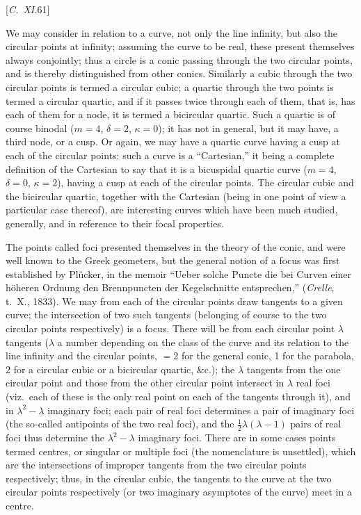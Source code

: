 \documentclass[12pt,a4paper,oneside]{book}
\newcommand{\paperref}[1]{\par\noindent\hfill[#1]\hfill\null\par}
\begin{document}
\paperref{\textit{C.~XI.}\hfill 61}
\newpage
We may consider in relation to a curve, not only the line infinity, but also the circular points at infinity; assuming the curve to be real, these present themselves always conjointly; thus a circle is a conic passing through the two circular points, and is thereby distinguished from other conics. Similarly a cubic through the two circular points is termed a circular cubic; a quartic through the two points is termed a circular quartic, and if it passes twice through each of them, that is, has each of them for a node, it is termed a bicircular quartic. Such a quartic is of course binodal ($m=4$, $\delta=2$, $\kappa=0$); it has not in general, but it may have, a third node, or a cusp. Or again, we may have a quartic curve having a cusp at each of the circular points: such a curve is a ``Cartesian,'' it being a complete definition of the Cartesian to say that it is a bicuspidal quartic curve ($m=4$, $\delta=0$, $\kappa=2$), having a cusp at each of the circular points. The circular cubic and the bicircular quartic, together with the Cartesian (being in one point of view a particular case thereof), are interesting curves which have been much studied, generally, and in reference to their focal properties.

The points called foci presented themselves in the theory of the conic, and were well known to the Greek geometers, but the general notion of a focus was first established by Pl\"ucker, in the memoir ``Ueber solche Puncte die bei Curven einer h\"oheren Ordnung den Brennpuncten der Kegelschnitte entsprechen,'' (\textit{Crelle}, t.~X., 1833). We may from each of the circular points draw tangents to a given curve; the intersection of two such tangents (belonging of course to the two circular points respectively) is a focus. There will be from each circular point $\lambda$ tangents ($\lambda$ a number depending on the class of the curve and its relation to the line infinity and the circular points, $=2$ for the general conic, 1 for the parabola, 2 for a circular cubic or a bicircular quartic, \&c.); the $\lambda$ tangents from the one circular point and those from the other circular point intersect in $\lambda$ real foci (viz.\ each of these is the only real point on each of the tangents through it), and in $\lambda^{2}-\lambda$ imaginary foci; each pair of real foci determines a pair of imaginary foci (the so-called antipoints of the two real foci), and the $\tfrac{1}{2}\lambda(\lambda-1)$ pairs of real foci thus determine the $\lambda^{2}-\lambda$ imaginary foci. There are in some cases points termed centres, or singular or multiple foci (the nomenclature is unsettled), which are the intersections of improper tangents from the two circular points respectively; thus, in the circular cubic, the tangents to the curve at the two circular points respectively (or two imaginary asymptotes of the curve) meet in a centre.
\end{document}
